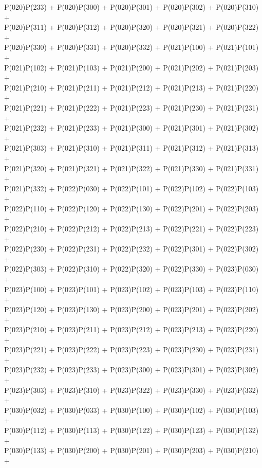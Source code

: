 P(020)P(233) + P(020)P(300) + P(020)P(301) + P(020)P(302) + P(020)P(310) +\\
P(020)P(311) + P(020)P(312) + P(020)P(320) + P(020)P(321) + P(020)P(322) +\\
P(020)P(330) + P(020)P(331) + P(020)P(332) + P(021)P(100) + P(021)P(101) +\\
P(021)P(102) + P(021)P(103) + P(021)P(200) + P(021)P(202) + P(021)P(203) +\\
P(021)P(210) + P(021)P(211) + P(021)P(212) + P(021)P(213) + P(021)P(220) +\\
P(021)P(221) + P(021)P(222) + P(021)P(223) + P(021)P(230) + P(021)P(231) +\\
P(021)P(232) + P(021)P(233) + P(021)P(300) + P(021)P(301) + P(021)P(302) +\\
P(021)P(303) + P(021)P(310) + P(021)P(311) + P(021)P(312) + P(021)P(313) +\\
P(021)P(320) + P(021)P(321) + P(021)P(322) + P(021)P(330) + P(021)P(331) +\\
P(021)P(332) + P(022)P(030) + P(022)P(101) + P(022)P(102) + P(022)P(103) +\\
P(022)P(110) + P(022)P(120) + P(022)P(130) + P(022)P(201) + P(022)P(203) +\\
P(022)P(210) + P(022)P(212) + P(022)P(213) + P(022)P(221) + P(022)P(223) +\\
P(022)P(230) + P(022)P(231) + P(022)P(232) + P(022)P(301) + P(022)P(302) +\\
P(022)P(303) + P(022)P(310) + P(022)P(320) + P(022)P(330) + P(023)P(030) +\\
P(023)P(100) + P(023)P(101) + P(023)P(102) + P(023)P(103) + P(023)P(110) +\\
P(023)P(120) + P(023)P(130) + P(023)P(200) + P(023)P(201) + P(023)P(202) +\\
P(023)P(210) + P(023)P(211) + P(023)P(212) + P(023)P(213) + P(023)P(220) +\\
P(023)P(221) + P(023)P(222) + P(023)P(223) + P(023)P(230) + P(023)P(231) +\\
P(023)P(232) + P(023)P(233) + P(023)P(300) + P(023)P(301) + P(023)P(302) +\\
P(023)P(303) + P(023)P(310) + P(023)P(322) + P(023)P(330) + P(023)P(332) +\\
P(030)P(032) + P(030)P(033) + P(030)P(100) + P(030)P(102) + P(030)P(103) +\\
P(030)P(112) + P(030)P(113) + P(030)P(122) + P(030)P(123) + P(030)P(132) +\\
P(030)P(133) + P(030)P(200) + P(030)P(201) + P(030)P(203) + P(030)P(210) +\\
